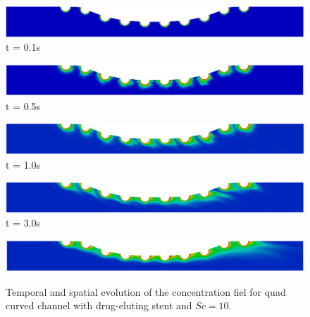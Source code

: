 \begin{figure}[H]
    \caption{
Temporal and spatial evolution of the concentration fiel for quad curved channel with drug-eluting stent and $Sc=10$.}
     \begin{minipage}{.50\linewidth}
      \centering
      \includegraphics[scale=0.18]{./02_chaps/cap_solution/figure/conc10_quadCurvedStrut1.png}\\
      t = 0.1s
     \end{minipage}%
     \begin{minipage}{.50\linewidth}
      \centering
      \includegraphics[scale=0.18]{./02_chaps/cap_solution/figure/conc10_quadCurvedStrut2.png}\\
      t = 0.5s
     \end{minipage}
     \begin{minipage}{.50\linewidth}
     \medskip
      \centering
      \includegraphics[scale=0.18]{./02_chaps/cap_solution/figure/conc10_quadCurvedStrut3.png}\\
      t = 1.0s
     \end{minipage}%
     \begin{minipage}{.50\linewidth}
     \medskip
      \centering
      \includegraphics[scale=0.18]{./02_chaps/cap_solution/figure/conc10_quadCurvedStrut4.png}\\
      t = 3.0s
     \end{minipage}
     \begin{minipage}{.50\linewidth}
      \centering
      \includegraphics[scale=0.18]{./02_chaps/cap_solution/figure/conc10_quadCurvedStrut5.png}\\

\end{minipage}
\end{figure}
